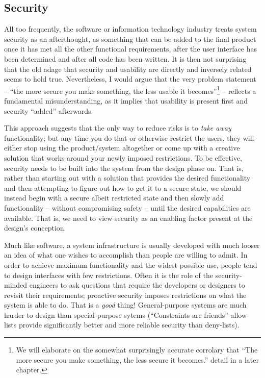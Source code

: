 \subsection{Security}
\label{introduction:pillars:security}

All too frequently, the software or information
technology industry treats system security as an
afterthought, as something that can be added to the
final product once it has met all the other functional
requirements, after the user interface has been
determined and after all code has been written.  It is
then not surprising that the old adage that security
and usability are directly and inversely related seems
to hold true.  Nevertheless, I would argue that the
very problem statement -- ``the more secure you make
something, the less usable it becomes''\footnote{We
will elaborate on the somewhat surprisingly accurate
corrolary that ``The more secure you make something,
the less secure it
becomes.''\cite{intro:norman-security} detail in a
later chapter.} -- reflects a fundamental
misunderstanding, as it implies that usability is
present first and security ``added'' afterwards.

This approach suggests that the only way to reduce
risks is to {\em take away} functionality; but any
time you do that or otherwise restrict the users, they
will either stop using the product/system altogether
or come up with a creative solution that works around
your newly imposed restrictions.  To be effective,
security needs to be built into the system from the
design phase on.  That is, rather than starting out
with a solution that provides the desired
functionality and then attempting to figure out how to
get it to a secure state, we should instead begin with
a secure albeit restricted state and then slowly add
functionality -- without compromising safety -- until
the desired capabilities are available.  That is, we
need to view security as an enabling factor present at
the design's conception.

Much like software, a system infrastructure is usually
developed with much looser an idea of what one wishes
to accomplish than people are willing to admit.  In
order to achieve maximum functionality and the widest
possible use, people tend to design interfaces with
few restrictions.  Often it is the role of the
security-minded engineers to ask questions that
require the developers or designers to revisit their
requirements; proactive security imposes restrictions
on what the system is able to do.  That is a {\em
good} thing!  General-purpose systems are much harder
to design than special-purpose sytems (``Constraints
are friends''\cite{intro:brooks-design} allow-lists
provide significantly better and more reliable
security than deny-lists).

